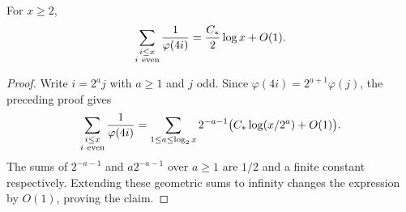 \begin{lemma}\label{lem:totient-even}
For $x\ge2$,
\[
 \sum_{\substack{i\le x\\i\ {\rm even}}}\frac1{\varphi(4i)}
       =\frac{C_*}{2}\log x+O(1).
\]
\end{lemma}
\begin{proof}
Write $i=2^a j$ with $a\ge1$ and $j$ odd. Since
$\varphi(4i)=2^{a+1}\varphi(j)$, the preceding proof gives
\[
 \sum_{\substack{i\le x\\i\ {\rm even}}}\frac1{\varphi(4i)}
 =\sum_{1\le a\le\log_2x}2^{-a-1}
       \bigl(C_*\log(x/2^a)+O(1)\bigr).
\]
The sums of $2^{-a-1}$ and $a2^{-a-1}$ over $a\ge1$
are $1/2$ and a finite constant respectively.
Extending these geometric sums to infinity changes the expression
by $O(1)$, proving the claim.
\end{proof}

